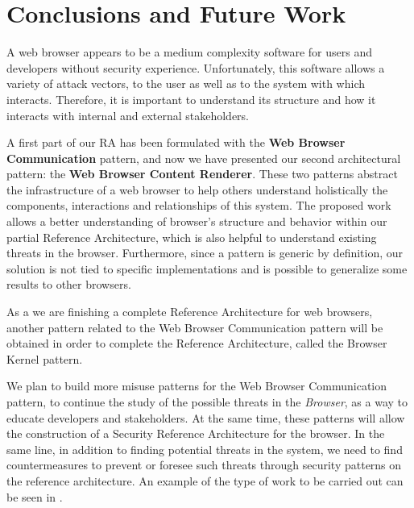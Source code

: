 \documentclass[]{acmlarge}
\begin{document}
\section{Conclusions and Future Work}
A web browser appears to be a medium complexity software for users and developers without security experience. Unfortunately, this software allows a variety of attack vectors, to the user as well as to the system with which interacts. Therefore, it is important to understand its structure and how it interacts with internal and external stakeholders.

A first part of our RA has been formulated with the \textbf{Web Browser Communication} pattern, and now we have presented our second architectural pattern: the \textbf{Web Browser Content Renderer}. These two patterns abstract the infrastructure of a web browser to help others understand holistically the components, interactions and relationships of this system. 
The proposed work allows a better understanding of browser's structure and behavior within our partial Reference Architecture, which is also helpful to understand existing threats in the browser. Furthermore, since a pattern is generic by definition, our solution is not tied to specific implementations and is possible to generalize some results to other browsers. 

As a we are finishing a complete Reference Architecture for web browsers, another pattern related to the Web Browser Communication pattern will be obtained in order to complete the Reference Architecture, called the Browser Kernel pattern. 

We plan to build more \cite{silva2015b} misuse patterns for the Web Browser Communication pattern, to continue the study of the possible threats in the \textit{Browser}, as a way to educate developers and stakeholders. At the same time, these patterns will allow the construction of a Security Reference Architecture for the browser. In the same line, in addition to finding potential threats in the system, we need to find countermeasures to prevent or foresee such threats through security patterns on the reference architecture. An example of the type of work to be carried out can be seen in \cite{Fernandez2016}.
\end{document}
